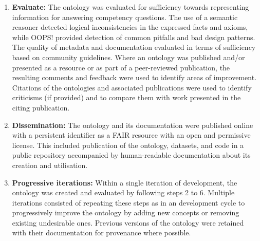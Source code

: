 \begin{enumerate}
    \item \textbf{Evaluate:} The ontology was evaluated for sufficiency towards representing information for answering competency questions. The use of a semantic reasoner detected logical inconsistencies in the expressed facts and axioms, while OOPS! provided detection of common pitfalls and bad design patterns.
    The quality of metadata and documentation evaluated in terms of sufficiency based on community guidelines. Where an ontology was published and/or presented as a resource or as part of a peer-reviewed publication, the resulting comments and feedback were used to identify areas of improvement. Citations of the ontologies and associated publications were used to identify criticisms (if provided) and to compare them with work presented in the citing publication.
    \item \textbf{Dissemination:} The ontology and its documentation were published online with a persistent identifier as a FAIR resource with an open and permissive license. This included publication of the ontology, datasets, and code in a public repository accompanied by human-readable documentation about its creation and utilisation.
    \item \textbf{Progressive iterations:} Within a single iteration of development, the ontology was created and evaluated by following steps 2 to 6. Multiple iterations consisted of repeating these steps as in an development cycle to progressively improve the ontology by adding new concepts or removing existing undesirable ones. Previous versions of the ontology were retained with their documentation for provenance where possible.
\end{enumerate}


